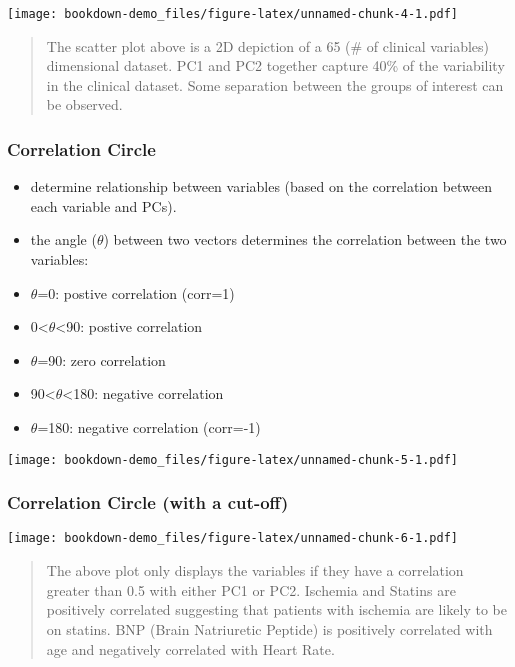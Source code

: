 \documentclass[]{book}
\begin{document}
\texttt{[image: bookdown-demo\_files/figure-latex/unnamed-chunk-4-1.pdf]}

\begin{quote}
The scatter plot above is a 2D depiction of a 65 (\# of clinical
variables) dimensional dataset. PC1 and PC2 together capture 40\% of the
variability in the clinical dataset. Some separation between the groups
of interest can be observed.
\end{quote}

\subsubsection{Correlation Circle}\label{correlation-circle}

\begin{itemize}
\item
  determine relationship between variables (based on the correlation
  between each variable and PCs).
\item
  the angle (\(\theta\)) between two vectors determines the correlation
  between the two variables:\\
\item
  \(\theta\)=0: postive correlation (corr=1)\\
\item
  0\textless{}\(\theta\)\textless{}90: postive correlation\\
\item
  \(\theta\)=90: zero correlation\\
\item
  90\textless{}\(\theta\)\textless{}180: negative correlation\\
\item
  \(\theta\)=180: negative correlation (corr=-1)
\end{itemize}

\texttt{[image: bookdown-demo\_files/figure-latex/unnamed-chunk-5-1.pdf]}

\subsubsection{Correlation Circle (with a
cut-off)}\label{correlation-circle-with-a-cut-off}

\texttt{[image: bookdown-demo\_files/figure-latex/unnamed-chunk-6-1.pdf]}

\begin{quote}
The above plot only displays the variables if they have a correlation
greater than 0.5 with either PC1 or PC2. Ischemia and Statins are
positively correlated suggesting that patients with ischemia are likely
to be on statins. BNP (Brain Natriuretic Peptide) is positively
correlated with age and negatively correlated with Heart Rate.
\end{quote}
\end{document}
